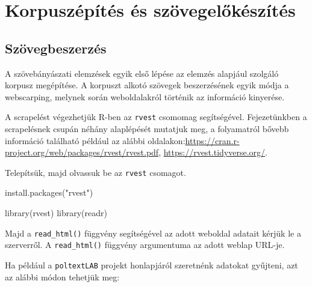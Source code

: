 \documentclass[
]{book}
\newenvironment{Shaded}{\begin{snugshade}}{\end{snugshade}}
\newcommand{\FunctionTok}[1]{\textcolor[rgb]{0.00,0.00,0.00}{#1}}
\newcommand{\NormalTok}[1]{#1}
\newcommand{\StringTok}[1]{\textcolor[rgb]{0.31,0.60,0.02}{#1}}
\begin{document}
\hypertarget{korpuszuxe9puxedtuxe9s-uxe9s-szuxf6vegelux151kuxe9szuxedtuxe9s}{%
\chapter{Korpuszépítés és
szövegelőkészítés}\label{korpuszuxe9puxedtuxe9s-uxe9s-szuxf6vegelux151kuxe9szuxedtuxe9s}}

\hypertarget{szuxf6vegbeszerzuxe9s}{%
\section{Szövegbeszerzés}\label{szuxf6vegbeszerzuxe9s}}

A szövebányászati elemzések egyik első lépése az elemzés alapjául
szolgáló korpusz megépítése. A korpuszt alkotó szövegek beszerzésének
egyik módja a webscarping, melynek során weboldalakról történik az
információ kinyerése.

A scrapelést végezhetjük R-ben az \texttt{rvest} csomomag segítségével.
Fejezetünkben a scrapelésnek csupán néhány alaplépését mutatjuk meg, a
folyamatról bővebb információ található például az alábbi
oldalakon:\url{https://cran.r-project.org/web/packages/rvest/rvest.pdf},
\url{https://rvest.tidyverse.org/}.

Telepítsük, majd olvassuk be az \texttt{rvest} csomagot.

\begin{Shaded}
\begin{Highlighting}[]

\FunctionTok{install.packages}\NormalTok{(}\StringTok{"rvest"}\NormalTok{)}
\end{Highlighting}
\end{Shaded}

\begin{Shaded}
\begin{Highlighting}[]

\FunctionTok{library}\NormalTok{(rvest)}
\FunctionTok{library}\NormalTok{(readr)}
\end{Highlighting}
\end{Shaded}

Majd a \texttt{read\_html()} függvény segítségével az adott weboldal
adatait kérjük le a szerverről. A \texttt{read\_html()} függvény
argumentuma az adott weblap URL-je.

Ha például a \texttt{poltextLAB} projekt honlapjáról szeretnénk adatokat
gyűjteni, azt az alábbi módon tehetjük meg:
\end{document}
